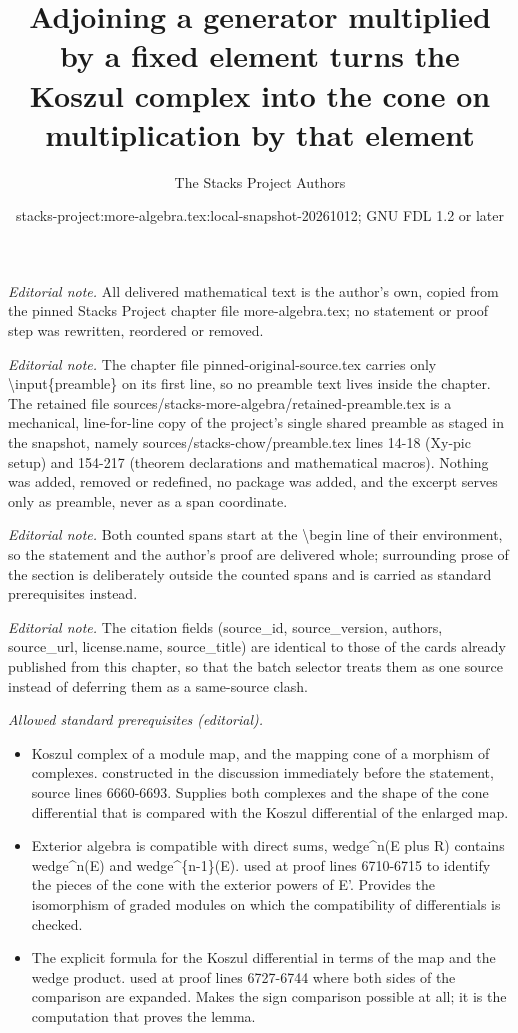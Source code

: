 \documentclass[10pt,a4paper]{amsart}
\title{Adjoining a generator multiplied by a fixed element turns the Koszul complex into the cone on multiplication by that element}
\author{The Stacks Project Authors}
\date{stacks-project:more-algebra.tex:local-snapshot-20261012; GNU FDL 1.2 or later}
\theoremstyle{plain}
\theoremstyle{definition}
\theoremstyle{remark}
\numberwithin{equation}{subsection}
\begin{document}
\maketitle
\setcounter{subsection}{1}
\noindent\textit{Editorial note.} All delivered mathematical text is the author's own, copied from the pinned Stacks Project chapter file more-algebra.tex; no statement or proof step was rewritten, reordered or removed.\par\medskip
\noindent\textit{Editorial note.} The chapter file pinned-original-source.tex carries only \textbackslash{}input\{preamble\} on its first line, so no preamble text lives inside the chapter. The retained file sources/stacks-more-algebra/retained-preamble.tex is a mechanical, line-for-line copy of the project's single shared preamble as staged in the snapshot, namely sources/stacks-chow/preamble.tex lines 14-18 (Xy-pic setup) and 154-217 (theorem declarations and mathematical macros). Nothing was added, removed or redefined, no package was added, and the excerpt serves only as preamble, never as a span coordinate.\par\medskip
\noindent\textit{Editorial note.} Both counted spans start at the \textbackslash{}begin line of their environment, so the statement and the author's proof are delivered whole; surrounding prose of the section is deliberately outside the counted spans and is carried as standard prerequisites instead.\par\medskip
\noindent\textit{Editorial note.} The citation fields (source\_id, source\_version, authors, source\_url, license.name, source\_title) are identical to those of the cards already published from this chapter, so that the batch selector treats them as one source instead of deferring them as a same-source clash.\par\medskip
\noindent\textit{Allowed standard prerequisites (editorial).}\begin{itemize}
\item Koszul complex of a module map, and the mapping cone of a morphism of complexes. constructed in the discussion immediately before the statement, source lines 6660-6693. Supplies both complexes and the shape of the cone differential that is compared with the Koszul differential of the enlarged map.
\item Exterior algebra is compatible with direct sums, wedge\textasciicircum{}n(E plus R) contains wedge\textasciicircum{}n(E) and wedge\textasciicircum{}\{n-1\}(E). used at proof lines 6710-6715 to identify the pieces of the cone with the exterior powers of E'. Provides the isomorphism of graded modules on which the compatibility of differentials is checked.
\item The explicit formula for the Koszul differential in terms of the map and the wedge product. used at proof lines 6727-6744 where both sides of the comparison are expanded. Makes the sign comparison possible at all; it is the computation that proves the lemma.
\end{itemize}\medskip
\end{document}
